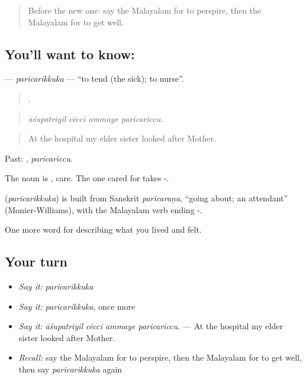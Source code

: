 \begin{quote}
Before the new one: say the Malayalam for to perspire, then the Malayalam for to get well.
\end{quote}

\subsection*{You'll want to know: }
\textbf{} — \emph{paricarikkuka} — \textquotedblleft{}to tend (the sick); to nurse\textquotedblright{}.

\begin{quote}
   .
\end{quote}

\begin{quote}
\emph{āśupatriyil cēcci ammaye paricariccu.}
\end{quote}

\begin{quote}
At the hospital my elder sister looked after Mother.
\end{quote}

Past: , \emph{paricariccu}.

The noun is , care. The one cared for takes -.

\begin{cousinweb}
\textbf{} (\emph{paricarikkuka}) is built from Sanskrit \emph{paricaraṇa}, \textquotedblleft{}going about; an attendant\textquotedblright{} (Monier-Williams), with the Malayalam verb ending -.
\end{cousinweb}

\begin{grammarlens}[title={What you've built}]
One more word for describing what you lived and felt.
\end{grammarlens}

\subsection*{Your turn}
\begin{itemize}
\raggedright
  \item \emph{Say it:} \emph{paricarikkuka}
  \item \emph{Say it:} \emph{paricarikkuka}, once more
  \item \emph{Say it:} \emph{āśupatriyil cēcci ammaye paricariccu.} — At the hospital my elder sister looked after Mother.
  \item \emph{Recall:} say the Malayalam for to perspire, then the Malayalam for to get well, then say \emph{paricarikkuka} again
\end{itemize}

